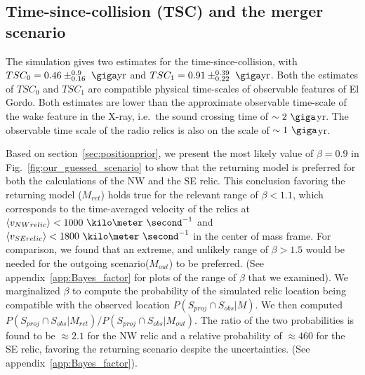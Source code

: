 \subsection{Time-since-collision (TSC) and the merger scenario}
The simulation gives two estimates for
the time-since-collision, with $TSC_0 = 0.46\pm^{0.9}_{0.16}~\giga \text{yr}$
and $TSC_1 =0.91\pm^{0.39}_{0.22}~\giga\text{yr}$. Both the estimates of
$TSC_0$ and $TSC_1$ are compatible physical time-scales of observable
features of El Gordo. Both estimates are lower than the approximate
observable time-scale of the wake feature in the X-ray, i.e.\ the sound
crossing time of $\sim2~\giga$yr. The observable time scale of the radio
relics is also on the scale of $\sim1~\giga$yr.\par 
Based on section~\ref{sec:positionprior}, we present the most likely
value of $\beta = 0.9$ in Fig.~\ref{fig:our_guessed_scenario} to show that
the returning model is preferred for both the calculations of the NW and the
SE relic. This conclusion favoring the returning model ($M_{ret}$) holds true for the
relevant range of $  \beta
< 1.1$, which corresponds to the time-averaged velocity of the relics at
$\langle v_{NW relic} \rangle < 1000~\kilo\meter~\second^{-1}$ and $\langle
v_{SE relic} \rangle < 1800~\kilo\meter~\second^{-1}$ in the center of
mass frame. For comparison, we found that an extreme, and unlikely
range of $\beta > 1.5$ would be needed for the outgoing scenario($M_{out}$) to be
preferred. (See appendix~\ref{app:Bayes_factor} for plots of the range
of $\beta$ that we examined). We marginalized $\beta$ to compute the
probability of the simulated relic location being compatible with the
observed location $P(S_{proj} \cap S_{obs}| M)$. We then computed   
$P(S_{proj} \cap S_{obs} | M_{ret}) / P(S_{proj} \cap S_{obs} | M_{out})$. 
The ratio of the two probabilities is found to be $\approx
2.1$ for the NW relic and a relative probability of $\approx 460$ for the
SE relic, favoring the returning scenario despite the
uncertainties. (See appendix~\ref{app:Bayes_factor}). 
